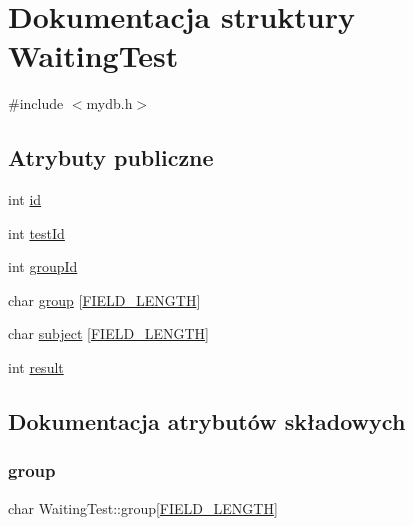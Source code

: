 \hypertarget{structWaitingTest}{}\section{Dokumentacja struktury Waiting\+Test}
\label{structWaitingTest}


{\ttfamily \#include $<$mydb.\+h$>$}

\subsection*{Atrybuty publiczne}
\begin{DoxyCompactItemize}
\item 
int \mbox{\hyperlink{structWaitingTest_aca46271acd631115b14685336c468ebd}{id}}
\item 
int \mbox{\hyperlink{structWaitingTest_a93485c1487f503bc4d2a6d41e44e58c4}{test\+Id}}
\item 
int \mbox{\hyperlink{structWaitingTest_a7e3bf0e2312a17b161256a6619335ef8}{group\+Id}}
\item 
char \mbox{\hyperlink{structWaitingTest_a2105c4f816499595ae662579723c06e8}{group}} \mbox{[}\mbox{\hyperlink{mydb_8h_a4e8ecaf2d59499a8c159ccdf7be1baec}{F\+I\+E\+L\+D\+\_\+\+L\+E\+N\+G\+TH}}\mbox{]}
\item 
char \mbox{\hyperlink{structWaitingTest_ae3556998232402cacea1e7dc3586b9b7}{subject}} \mbox{[}\mbox{\hyperlink{mydb_8h_a4e8ecaf2d59499a8c159ccdf7be1baec}{F\+I\+E\+L\+D\+\_\+\+L\+E\+N\+G\+TH}}\mbox{]}
\item 
int \mbox{\hyperlink{structWaitingTest_a306225af7bbbb6ec73d52402b2c27504}{result}}
\end{DoxyCompactItemize}


\subsection{Dokumentacja atrybutów składowych}
\mbox{\label{structWaitingTest_a2105c4f816499595ae662579723c06e8}} 
\subsubsection{\texorpdfstring{group}{group}}
{\footnotesize\ttfamily char Waiting\+Test\+::group\mbox{[}\mbox{\hyperlink{mydb_8h_a4e8ecaf2d59499a8c159ccdf7be1baec}{F\+I\+E\+L\+D\+\_\+\+L\+E\+N\+G\+TH}}\mbox{]}}

